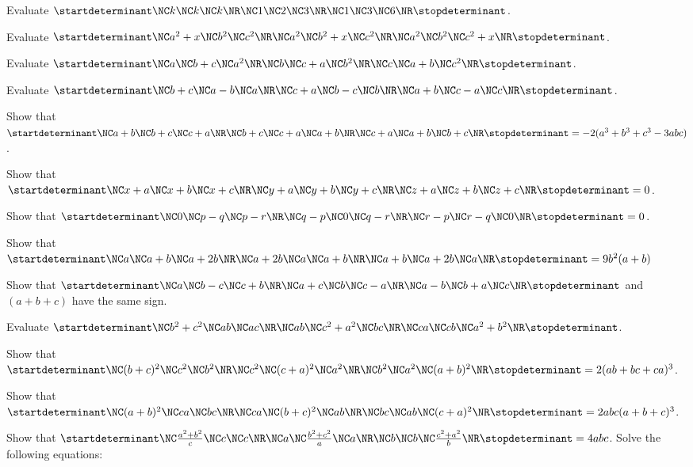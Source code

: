 \item Evaluate $\startdeterminant\NC  k \NC k \NC k\NR\NC 1 \NC 2 \NC 3\NR\NC  1\NC 3 \NC 6\NR\stopdeterminant$.
\item Evaluate $\startdeterminant\NC  a^2 + x \NC b^2 \NC c^2\NR\NC a^2 \NC b^2 + x \NC c^2\NR\NC a^2 \NC b^2 \NC c^2 + x\NR\stopdeterminant$.
\item Evaluate $\startdeterminant\NC  a \NC b + c \NC a^2\NR\NC b \NC c + a \NC b^2\NR\NC c \NC a + b \NC c^2\NR\stopdeterminant$.
\item Evaluate $\startdeterminant\NC  b + c \NC a - b \NC a\NR\NC c + a \NC b - c \NC b\NR\NC a + b \NC c - a \NC c\NR\stopdeterminant$.
\item Show that $\startdeterminant\NC  a + b \NC b + c \NC c + a\NR\NC b + c \NC c + a \NC a + b\NR\NC c + a \NC a + b \NC b + c\NR\stopdeterminant = -2(a^3 + b^3 +
  c^3 - 3abc)$.
\item Show that $\startdeterminant\NC  x + a \NC x + b \NC x + c\NR\NC y + a \NC y + b \NC y + c\NR\NC z + a\NC z + b \NC z + c\NR\stopdeterminant = 0$.
\item Show that $\startdeterminant\NC  0 \NC p - q \NC p - r\NR\NC  q - p \NC 0 \NC q - r\NR\NC  r - p \NC r - q \NC 0\NR\stopdeterminant = 0$.
\item Show that $\startdeterminant\NC  a \NC a + b \NC a + 2b\NR\NC a + 2b \NC a \NC a + b\NR\NC a + b \NC a + 2b \NC a\NR\stopdeterminant = 9b^2(a + b)$
\item Show that $\startdeterminant\NC  a \NC b - c \NC c + b\NR\NC  a + c \NC b \NC c - a\NR\NC  a - b \NC b + a \NC c\NR\stopdeterminant$ and $(a + b + c)$ have the
  same sign.
\item Evaluate $\startdeterminant\NC  b^2 + c^2 \NC ab \NC ac\NR\NC ab \NC c^2 + a^2 \NC bc\NR\NC ca \NC cb \NC a^2 + b^2\NR\stopdeterminant$.
\item Show that $\startdeterminant\NC  (b + c)^2 \NC c^2 \NC b^2\NR\NC c^2 \NC (c + a)^2 \NC a^2\NR\NC b^2 \NC a^2 \NC (a + b)^2\NR\stopdeterminant = 2(ab + bc +
  ca)^3$.
\item Show that $\startdeterminant\NC  (a + b)^2 \NC ca \NC bc\NR\NC ca \NC (b + c)^2 \NC ab\NR\NC bc \NC ab \NC (c + a)^2\NR\stopdeterminant = 2abc(a + b + c)^3$.
\item Show that $\startdeterminant\NC  \frac{a^2 + b^2}{c} \NC c \NC c\NR\NC a \NC \frac{b^2 + c^2}{a} \NC a\NR\NC b \NC b \NC \frac{c^2 + a^2}{b}\NR\stopdeterminant
  = 4abc$.
\stopitemize
Solve the following equations:

